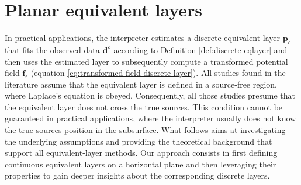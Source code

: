 \section{Planar equivalent layers}
\label{eq:planar_eqlayer}

In practical applications, the interpreter estimates a discrete equivalent layer $\mathbf{p}_{\epsilon}$ 
that fits the observed data $\mathbf{d}^{o}$ according to Definition \ref{def:discrete-eqlayer} and then 
uses the estimated layer to subsequently compute a transformed potential field $\mathbf{f}_{\epsilon}$ 
(equation \ref{eq:transformed-field-discrete-layer}).
All studies found in the literature assume that the equivalent layer is defined in a source-free region, where  
Laplace’s equation is obeyed. Consequently, all those studies presume that the equivalent layer 
does not cross the true sources. This condition cannot be guaranteed in practical applications, where 
the interpreter usually does not know the true sources position in the subsurface.
What follows aims at investigating the underlying assumptions and providing the theoretical background 
that support all equivalent-layer methods.
Our approach consists in first defining continuous equivalent layers on a horizontal plane and then leveraging 
their properties to gain deeper insights about the corresponding discrete layers.

